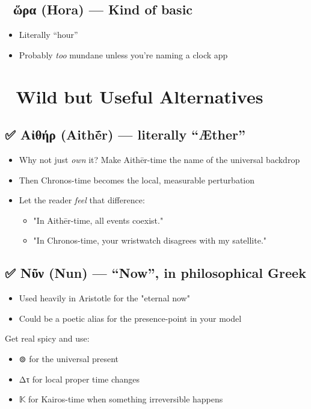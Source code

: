 \documentclass[a4paper,12pt]{article}
\begin{document}
\subsection*{🚫 ὥρα (Hora) — Kind of basic}
\begin{itemize}
\item Literally “hour”
\item Probably \textit{too} mundane unless you’re naming a clock app
\end{itemize}


\section*{🧠 Wild but Useful Alternatives}
\subsection*{✅ Αἰθήρ (Aithḗr) — literally “Æther”}
\begin{itemize}
\item Why not just \textit{own} it? Make Aithēr-time the name of the universal backdrop
\item Then Chronos-time becomes the local, measurable perturbation
\item Let the reader \textit{feel} that difference:
\begin{itemize}
\item "In Aithēr-time, all events coexist."
\item "In Chronos-time, your wristwatch disagrees with my satellite."
\end{itemize}\end{itemize}

\subsection*{✅ Νῦν (Nun) — “Now”, in philosophical Greek}
\begin{itemize}
\item Used heavily in Aristotle for the "eternal now"
\item Could be a poetic alias for the presence-point in your model
\end{itemize}




Get real spicy and use:


\begin{itemize}
\item ⊚ for the universal present
\item Δτ for local proper time changes
\item 𝕂 for Kairos-time when something irreversible happens
\end{itemize}
\end{document}
